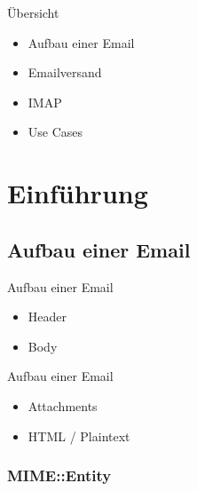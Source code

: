 \usepackage{minted}

\date{GPW 2018, Gummersbach, 5. April}


\maketitle

\begin{frame}
  \titlepage
\end{frame}

\cleardoublepage

\tableofcontents

\cleardoublepage

\begin{frame}{Übersicht}
  \begin{itemize}
  \item Aufbau einer Email
  \item Emailversand
  \item IMAP
  \item Use Cases  
  \end{itemize}
\end{frame}

\section{Einführung}

\subsection{Aufbau einer Email}

\begin{frame}{Aufbau einer Email}
  \begin{itemize}
  \item Header
  \item Body
  \end{itemize}
\end{frame}

\begin{frame}{Aufbau einer Email}
  \begin{itemize}
  \item Attachments
  \item HTML / Plaintext
  \end{itemize}
\end{frame}

\subsubsection{MIME::Entity}


